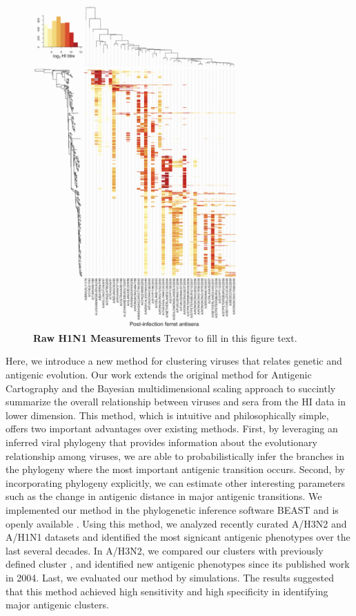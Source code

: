 \documentclass[11pt,oneside,letterpaper]{article}
\begin{document}
\begin{figure}[h]
	\centering		
	\includegraphics[width=0.7\textwidth]{figures/custom/H1titerheatmap}
	\caption{\textbf{Raw H1N1 Measurements} 
Trevor to fill in this figure text.
		} 
	\label{H1N1titer} 
\end{figure}


Here, we introduce a new method for clustering viruses that relates genetic and antigenic evolution. 
Our work extends the original method for Antigenic Cartography \cite{smith_mapping_2004} and the Bayesian multidimensional scaling approach \cite{bedford_integrating_2014} to succintly summarize the overall relationship between viruses and sera from the HI data in lower dimension.
This method, which is intuitive and philosophically simple, offers two important advantages over existing methods. 
First, by leveraging an inferred viral phylogeny that provides information about the evolutionary relationship among viruses, we are able to probabilistically infer the branches in the phylogeny where the most important antigenic transition occurs. 
Second, by incorporating phylogeny explicitly, we can estimate other interesting parameters such as the change in antigenic distance in major antigenic transitions. 
We implemented our method in the phylogenetic inference software BEAST and is openly available \cite{drummond_beast:_2007}.
Using this method, we analyzed recently curated A/H3N2 and A/H1N1 datasets and identified the most signicant antigenic phenotypes over the last several decades. 
In A/H3N2, we compared our clusters with previously defined cluster \cite{smith_mapping_2004}, and identified new antigenic phenotypes since its published work in 2004. 
Last, we evaluated our method by simulations.
The results suggested that this method achieved high sensitivity and high specificity in identifying major antigenic clusters.
\end{document}
